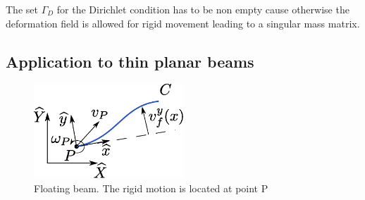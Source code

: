 \documentclass{svjour3}                     %
\begin{document}
\begin{remark}\label{rmk:dirich}
	The set $\Gamma_D$ for the Dirichlet condition has to be non empty cause otherwise the deformation field is allowed for rigid movement leading to a singular mass matrix. 
\end{remark}

\subsection{Application to thin planar beams}
\label{sec:ph_floatbeam}

\begin{figure}[t]
	\centering
	\includegraphics[width=0.5\textwidth]{beam.eps} 
	\caption{Floating beam. The rigid motion is located at point P}
	\label{fig:beam}
\end{figure}
\end{document}
